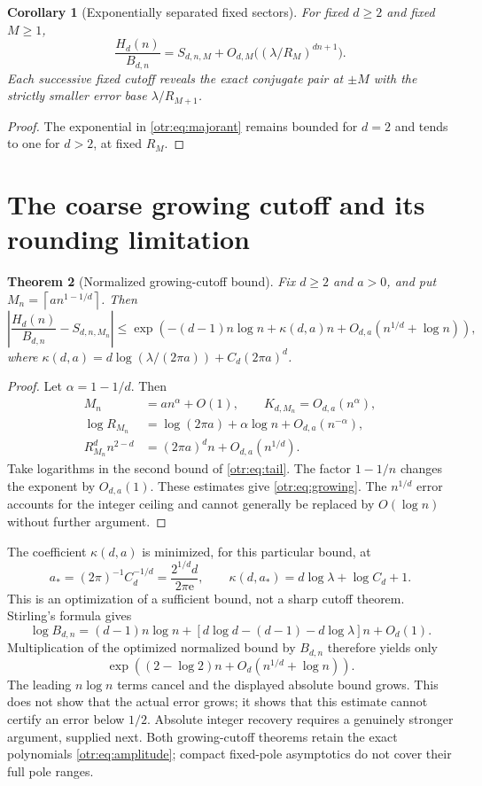 \documentclass[11pt,a4paper]{article}
\newtheorem{theorem}{Theorem}[section]
\newtheorem{corollary}[theorem]{Corollary}
\theoremstyle{definition}\newtheorem{definition}[theorem]{Definition}
\theoremstyle{remark}\newtheorem{remark}[theorem]{Remark}
\newcommand{\lam}{\lambda}
\newcommand{\e}{\mathrm e}
\newcommand{\ceil}[1]{\left\lceil #1\right\rceil}
\begin{document}
\begin{corollary}[Exponentially separated fixed sectors]\label{otr:cor:fixed}
For fixed $d\ge2$ and fixed $M\ge1$,
\[
 \frac{H_d(n)}{B_{d,n}}=S_{d,n,M}
       +O_{d,M}\bigl((\lam/R_M)^{dn+1}\bigr).
\]
Each successive fixed cutoff reveals the exact conjugate pair at $\pm M$ with the strictly smaller error base $\lam/R_{M+1}$.
\end{corollary}
\begin{proof}
The exponential in \eqref{otr:eq:majorant} remains bounded for $d=2$ and tends to one for $d>2$, at fixed $R_M$.
\end{proof}

\section{The coarse growing cutoff and its rounding limitation}
\label{otr:sec:coarse}
\begin{theorem}[Normalized growing-cutoff bound]\label{otr:thm:coarse}
Fix $d\ge2$ and $a>0$, and put $M_n=\ceil{a n^{1-1/d}}$. Then
\begin{equation}\label{otr:eq:growing}
 \left|\frac{H_d(n)}{B_{d,n}}-S_{d,n,M_n}\right|
 \le\exp\left(-(d-1)n\log n+\kappa(d,a)n
               +O_{d,a}(n^{1/d}+\log n)\right),
\end{equation}
where
$\kappa(d,a)=d\log(\lam/(2\pi a))+C_d(2\pi a)^d$.
\end{theorem}
\begin{proof}
Let $\alpha=1-1/d$. Then
\begin{align*}
 M_n&=a n^\alpha+O(1),\qquad K_{d,M_n}=O_{d,a}(n^\alpha),\\
 \log R_{M_n}&=\log(2\pi a)+\alpha\log n+O_{d,a}(n^{-\alpha}),\\
 R_{M_n}^dn^{2-d}&=(2\pi a)^dn+O_{d,a}(n^{1/d}).
\end{align*}
Take logarithms in the second bound of \eqref{otr:eq:tail}. The factor $1-1/n$ changes the exponent by $O_{d,a}(1)$. These estimates give \eqref{otr:eq:growing}. The $n^{1/d}$ error accounts for the integer ceiling and cannot generally be replaced by $O(\log n)$ without further argument.
\end{proof}

The coefficient $\kappa(d,a)$ is minimized, for this particular bound, at
\[
 a_*=(2\pi)^{-1}C_d^{-1/d}
     =\frac{2^{1/d}d}{2\pi\e},\qquad
 \kappa(d,a_*)=d\log\lam+\log C_d+1.
\]
This is an optimization of a sufficient bound, not a sharp cutoff theorem.
Stirling's formula gives
\[
 \log B_{d,n}=(d-1)n\log n+
 [d\log d-(d-1)-d\log\lam]n+O_d(1).
\]
Multiplication of the optimized normalized bound by $B_{d,n}$ therefore yields only
\begin{equation}\label{otr:eq:coarselimit}
 \exp\left((2-\log2)n+O_d(n^{1/d}+\log n)\right).
\end{equation}
The leading $n\log n$ terms cancel and the displayed absolute bound grows. This does not show that the actual error grows; it shows that this estimate cannot certify an error below $1/2$. Absolute integer recovery requires a genuinely stronger argument, supplied next. Both growing-cutoff theorems retain the exact polynomials \eqref{otr:eq:amplitude}; compact fixed-pole asymptotics do not cover their full pole ranges.
\end{document}
